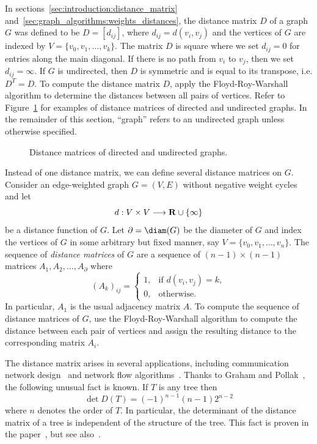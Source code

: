 In sections~\ref{sec:introduction:distance_matrix}
and~\ref{sec:graph_algorithms:weights_distances}, the distance matrix
$D$ of a graph $G$ was defined to be $D = [d_{ij}]$, where
$d_{ij} = d(v_i, v_j)$ and the vertices of $G$ are indexed by
$V = \{v_0, v_1, \dots, v_k\}$. The matrix $D$ is square where we set
$d_{ij} = 0$ for entries along the main diagonal. If there is no path
from $v_i$ to $v_j$, then we set $d_{ij} = \infty$. If $G$ is
undirected, then $D$ is symmetric and is equal to its transpose,
i.e. $D^T = D$. To compute the distance matrix $D$, apply the
Floyd-Roy-Warshall algorithm to
determine the distances between all pairs of vertices. Refer to
Figure~\ref{fig:distance_connectivity:distance_matrix_directed_undirected_graphs}
for examples of distance matrices of directed and undirected
graphs. In the remainder of this section, ``graph'' refers to an
undirected graph unless otherwise specified.

\begin{figure}[!htbp]
\centering
{}

\caption{Distance matrices of directed and undirected graphs.}
\label{fig:distance_connectivity:distance_matrix_directed_undirected_graphs}
\end{figure}

Instead of one distance matrix, we can define several distance
matrices on $G$. Consider an edge-weighted graph $G = (V,E)$ without
negative weight cycles and let
\[
d: V \times V \longrightarrow \mathbf{R} \cup \{\infty\}
\]
be a distance function of $G$. Let $\partial = \diam(G)$ be the
diameter of $G$ and index the vertices of $G$ in some arbitrary but
fixed manner, say $V = \{v_0, v_1, \dots, v_n\}$. The sequence of
\emph{distance matrices} of $G$ are a sequence
of $(n - 1) \times (n - 1)$ matrices $A_1, A_2, \dots, A_\partial$ where
\[
(A_k)_{ij}
=
\begin{cases}
1, & \text{if $d(v_i, v_j) = k$}, \\[4pt]
0, & \text{otherwise}.
\end{cases}
\]
In particular, $A_1$ is the usual adjacency matrix $A$. To compute the
sequence of distance matrices of $G$, use the
Floyd-Roy-Warshall algorithm to
compute the distance between each pair of vertices and assign the
resulting distance to the corresponding matrix $A_i$.

The distance matrix arises in several applications, including
communication network design~\cite{GrahamPollak1971} and network flow
algorithms~\cite{Dijkstra1959}. Thanks to
Graham and
Pollak~\cite{GrahamPollak1971}, the following
unusual fact is known. If $T$ is any tree then
\[
\det D(T)
=
(-1)^{n - 1} (n - 1) 2^{n - 2}
\]
where $n$ denotes the order of $T$. In particular, the determinant of
the distance matrix of a tree is independent of the structure of the
tree.  This fact is proven in the paper~\cite{GrahamPollak1971}, but
see also~\cite{EdelbergEtAl1976}.


